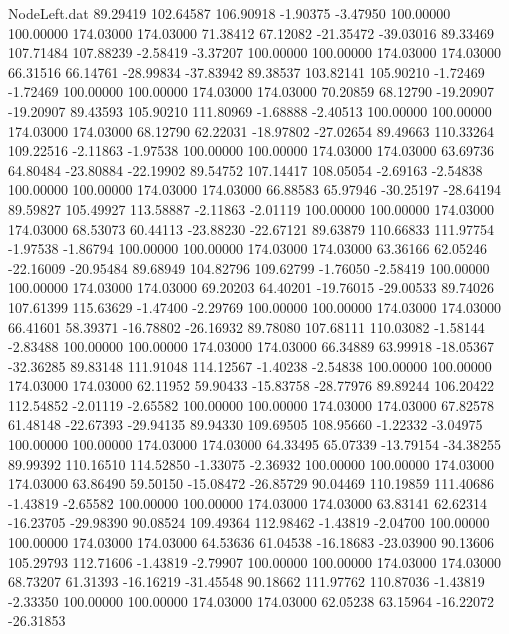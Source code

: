 \begin{filecontents}{NodeLeft.dat}
  89.29419  102.64587  106.90918    -1.90375   -3.47950  100.00000  100.00000  174.03000  174.03000   71.38412   67.12082  -21.35472  -39.03016
  89.33469  107.71484  107.88239    -2.58419   -3.37207  100.00000  100.00000  174.03000  174.03000   66.31516   66.14761  -28.99834  -37.83942
  89.38537  103.82141  105.90210    -1.72469   -1.72469  100.00000  100.00000  174.03000  174.03000   70.20859   68.12790  -19.20907  -19.20907
  89.43593  105.90210  111.80969    -1.68888   -2.40513  100.00000  100.00000  174.03000  174.03000   68.12790   62.22031  -18.97802  -27.02654
  89.49663  110.33264  109.22516    -2.11863   -1.97538  100.00000  100.00000  174.03000  174.03000   63.69736   64.80484  -23.80884  -22.19902
  89.54752  107.14417  108.05054    -2.69163   -2.54838  100.00000  100.00000  174.03000  174.03000   66.88583   65.97946  -30.25197  -28.64194
  89.59827  105.49927  113.58887    -2.11863   -2.01119  100.00000  100.00000  174.03000  174.03000   68.53073   60.44113  -23.88230  -22.67121
  89.63879  110.66833  111.97754    -1.97538   -1.86794  100.00000  100.00000  174.03000  174.03000   63.36166   62.05246  -22.16009  -20.95484
  89.68949  104.82796  109.62799    -1.76050   -2.58419  100.00000  100.00000  174.03000  174.03000   69.20203   64.40201  -19.76015  -29.00533
  89.74026  107.61399  115.63629    -1.47400   -2.29769  100.00000  100.00000  174.03000  174.03000   66.41601   58.39371  -16.78802  -26.16932
  89.78080  107.68111  110.03082    -1.58144   -2.83488  100.00000  100.00000  174.03000  174.03000   66.34889   63.99918  -18.05367  -32.36285
  89.83148  111.91048  114.12567    -1.40238   -2.54838  100.00000  100.00000  174.03000  174.03000   62.11952   59.90433  -15.83758  -28.77976
  89.89244  106.20422  112.54852    -2.01119   -2.65582  100.00000  100.00000  174.03000  174.03000   67.82578   61.48148  -22.67393  -29.94135
  89.94330  109.69505  108.95660    -1.22332   -3.04975  100.00000  100.00000  174.03000  174.03000   64.33495   65.07339  -13.79154  -34.38255
  89.99392  110.16510  114.52850    -1.33075   -2.36932  100.00000  100.00000  174.03000  174.03000   63.86490   59.50150  -15.08472  -26.85729
  90.04469  110.19859  111.40686    -1.43819   -2.65582  100.00000  100.00000  174.03000  174.03000   63.83141   62.62314  -16.23705  -29.98390
  90.08524  109.49364  112.98462    -1.43819   -2.04700  100.00000  100.00000  174.03000  174.03000   64.53636   61.04538  -16.18683  -23.03900
  90.13606  105.29793  112.71606    -1.43819   -2.79907  100.00000  100.00000  174.03000  174.03000   68.73207   61.31393  -16.16219  -31.45548
  90.18662  111.97762  110.87036    -1.43819   -2.33350  100.00000  100.00000  174.03000  174.03000   62.05238   63.15964  -16.22072  -26.31853

\end{filecontents}
